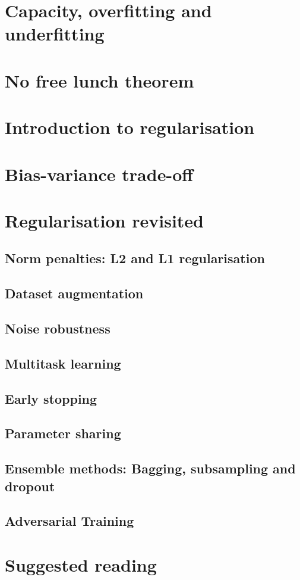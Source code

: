 \section{Capacity, overfitting and underfitting}



\section{No free lunch theorem}


\section{Introduction to regularisation}


\section{Bias-variance trade-off}







\section{Regularisation revisited}
\subsection{Norm penalties: L2 and L1 regularisation}
\subsection{Dataset augmentation}
\subsection{Noise robustness}
\subsection{Multitask learning}
\subsection{Early stopping}
\subsection{Parameter sharing}
\subsection{Ensemble methods: Bagging, subsampling and dropout}
\subsection{Adversarial Training}


\section{Suggested reading}

